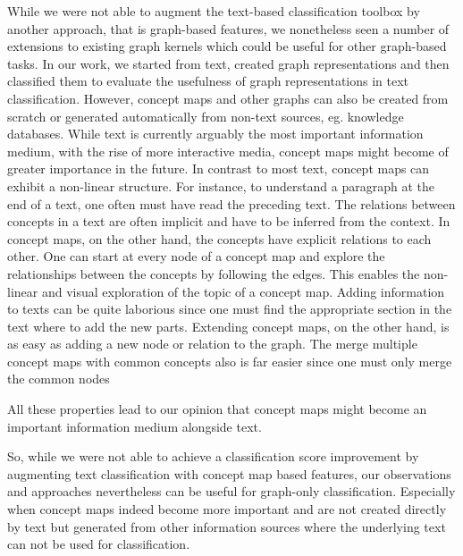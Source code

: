 While we were not able to augment the text-based classification toolbox by another approach, that is graph-based features, we nonetheless seen a number of extensions to existing graph kernels which could be useful for other graph-based tasks.
In our work, we started from text, created graph representations and then classified them to evaluate the usefulness of graph representations in text classification.
However, concept maps and other graphs can also be created from scratch or generated automatically from non-text sources, eg. knowledge databases.
While text is currently arguably the most important information medium, with the rise of more interactive media, concept maps might become of greater importance in the future.
In contrast to most text, concept maps can exhibit a non-linear structure.
For instance, to understand a paragraph at the end of a text, one often must have read the preceding text.
The relations between concepts in a text are often implicit and have to be inferred from the context.
In concept maps, on the other hand, the concepts have explicit relations to each other.
One can start at every node of a concept map and explore the relationships between the concepts by following the edges.
This enables the non-linear and visual exploration of the topic of a concept map.
Adding information to texts can be quite laborious since one must find the appropriate section in the text where to add the new parts.
Extending concept maps, on the other hand, is as easy as adding a new node or relation to the graph.
The merge multiple concept maps with common concepts also is far easier since one must only merge the common nodes

All these properties lead to our opinion that concept maps might become an important information medium alongside text.

So, while we were not able to achieve a classification score improvement by augmenting text classification with concept map based features, our observations and approaches nevertheless can be useful for graph-only classification.
Especially when concept maps indeed become more important and are not created directly by text but generated from other information sources where the underlying text can not be used for classification.


